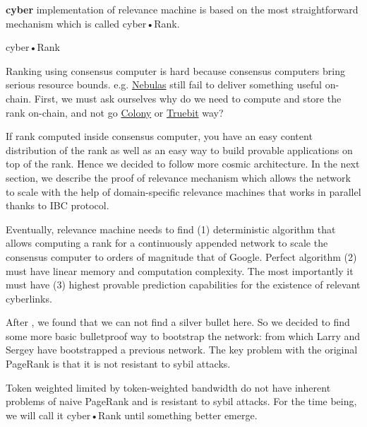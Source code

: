 \documentclass[10pt,oneside]{amsart}
\makeatletter
\def\section{\@startsection{section}{1}%
  \z@{.7\linespacing\@plus\linespacing}{.5\linespacing}%
  {\normalfont\scshape}}%
\newcommand{\code}[1]{\textbf{#1}}
\newcommand{\linkred}[2]{\href{#1}{\color{red}{#2}}}
\makeatother
\begin{document}
\code{cyber} implementation of relevance machine is based on the most straightforward mechanism which is called cyber•Rank.

\section{cyber•Rank}\label{cyberRank}

Ranking using consensus computer is hard because consensus computers bring serious resource bounds. e.g. 
\href{https://ipfs.io/ipfs/QmWTZjDZNbBqcJ5b6VhWGXBQ5EQavKKDteHsdoYqB5CBjh}{Nebulas}
 still fail to deliver something useful on-chain. First, we must ask ourselves why do we need to compute and store the rank on-chain, and not go 
 \href{https://ipfs.io/ipfs/QmZo7eY5UdJYotf3Z9GNVBGLjkCnE1j2fMdW2PgGCmvGPj}{Colony}
  or 
  \href{https://ipfs.io/ipfs/QmTrxXp2xhB2zWGxhNoLgsztevqKLwpy5HwKjLjzFa7rnD}{Truebit} way?

If rank computed inside consensus computer, you have an easy content distribution of the rank as well as an easy way to build provable applications on top of the rank. Hence we decided to follow more cosmic architecture. In the next section, we describe the proof of relevance mechanism which allows the network to scale with the help of domain-specific relevance machines that works in parallel thanks to IBC protocol.

Eventually, relevance machine needs to find (1) deterministic algorithm that allows computing a rank for a continuously appended network to scale the consensus computer to orders of magnitude that of Google. Perfect algorithm (2) must have linear memory and computation complexity. The most importantly it must have (3) highest provable prediction capabilities for the existence of relevant cyberlinks.                   

After \linkred{https://arxiv.org/pdf/1709.09002.pdf}{some research}, we found that we can not find a silver bullet here. So we decided to find some more basic bulletproof way to bootstrap the network: 
\linkred{http://ilpubs.stanford.edu:8090/422/1/1999-66.pdf}{the rank}
 from which Larry and Sergey have bootstrapped a previous network. The key problem with the original PageRank is that it is not resistant to sybil attacks.

Token weighted 
\linkred{http://ilpubs.stanford.edu:8090/422/1/1999-66.pdf}{PageRank}
 limited by token-weighted bandwidth do not have inherent problems of naive PageRank and is resistant to sybil attacks. For the time being, we will call it cyber•Rank until something better emerge.
\end{document}
